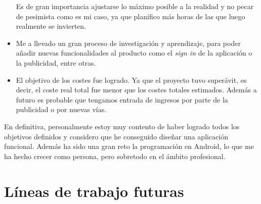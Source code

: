 \begin{itemize}
	Es de gran importancia ajustarse lo máximo posible a la realidad y no pecar de pesimista como es mi caso, ya que planifico más horas de las que luego realmente se invierten.
	
	\item Me a llevado un gran proceso de investigación y aprendizaje, para poder añadir nuevas funcionalidades al producto como el \emph{sign in} de la aplicación o la publicidad, entre otras.
	
	\item El objetivo de los costes fue logrado. Ya que el proyecto tuvo superávit, es decir, el coste real total fue menor que los costes totales estimados. Además a futuro es probable que tengamos entrada de ingresos por parte de la publicidad o por nuevas vías.
	
\end{itemize}

En definitiva, personalmente estoy muy contento de haber logrado todos los objetivos definidos y considero que he conseguido diseñar una aplicación funcional. Además ha sido una gran reto la programación en Android, lo que me ha hecho crecer como persona, pero sobretodo en el ámbito profesional.


\section{Líneas de trabajo futuras}

